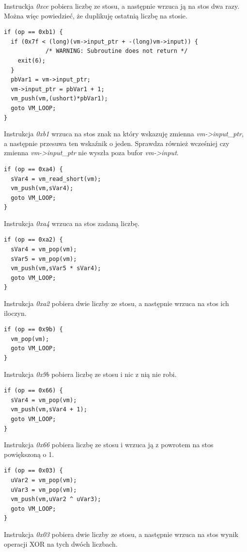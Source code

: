\documentclass[language=polish,type=eng]{aghmodern}
\begin{document}
Instruckja \emph{0xce} pobiera liczbę ze stosu, a następnie wrzuca ją na stos dwa razy.
Można więc powiedzieć, że duplikuję ostatnią liczbę na stosie.

\begin{verbatim}
if (op == 0xb1) {
  if (0x7f < (long)(vm->input_ptr + -(long)vm->input)) {
            /* WARNING: Subroutine does not return */
    exit(6);
  }
  pbVar1 = vm->input_ptr;
  vm->input_ptr = pbVar1 + 1;
  vm_push(vm,(ushort)*pbVar1);
  goto VM_LOOP;
}
\end{verbatim}

Instrukcja \emph{0xb1} wrzuca na stos znak na który wskazuję zmienna \emph{vm->input\_ptr},
a następnie przesuwa ten wskaźnik o jeden. Sprawdza również wcześniej czy zmienna
\emph{vm->input\_ptr} nie wyszła poza bufor \emph{vm->input}.

\begin{verbatim}
if (op == 0xa4) {
  sVar4 = vm_read_short(vm);
  vm_push(vm,sVar4);
  goto VM_LOOP;
}
\end{verbatim}

Instrukcja \emph{0xa4} wrzuca na stos zadaną liczbę.

\begin{verbatim}
if (op == 0xa2) {
  sVar4 = vm_pop(vm);
  sVar5 = vm_pop(vm);
  vm_push(vm,sVar5 * sVar4);
  goto VM_LOOP;
}
\end{verbatim}

Instrukcja \emph{0xa2} pobiera dwie liczby ze stosu, a następnie wrzuca na stos ich iloczyn.

\begin{verbatim}
if (op == 0x9b) {
  vm_pop(vm);
  goto VM_LOOP;
}
\end{verbatim}

Instrukcja \emph{0x9b} pobiera liczbę ze stosu i nic z nią nie robi.

\begin{verbatim}
if (op == 0x66) {
  sVar4 = vm_pop(vm);
  vm_push(vm,sVar4 + 1);
  goto VM_LOOP;
}
\end{verbatim}

Instrukcja \emph{0x66} pobiera liczbę ze stosu i wrzuca ją z powrotem na stos powiększoną o 1.

\begin{verbatim}
if (op == 0x03) {
  uVar2 = vm_pop(vm);
  uVar3 = vm_pop(vm);
  vm_push(vm,uVar2 ^ uVar3);
  goto VM_LOOP;
}
\end{verbatim}

Instrukcja \emph{0x03} pobiera dwie liczby ze stosu, a następnie wrzuca na stos wynik operacji
XOR na tych dwóch liczbach.
\end{document}
